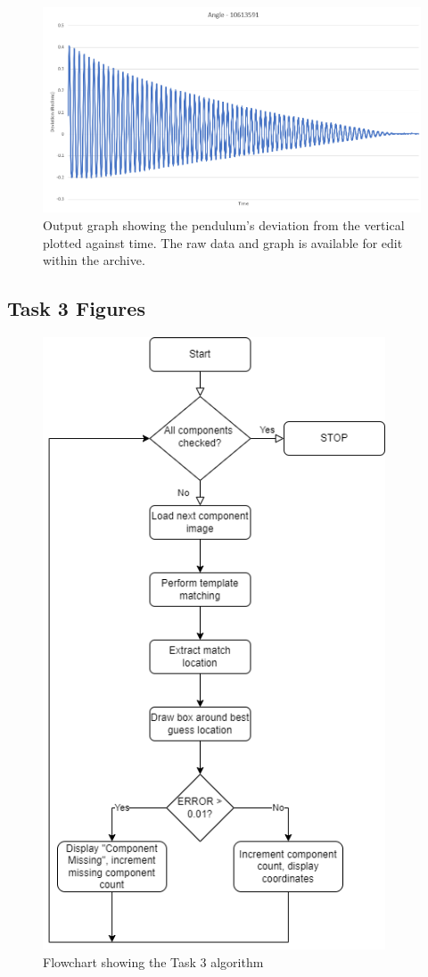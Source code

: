 \documentclass[conference]{IEEEtran}
\begin{document}
\begin{figure}[H]
\centering
\includegraphics[width=5in]{t2_graph}
\caption{Output graph showing the pendulum's deviation from the vertical plotted against time. The raw data and graph is available for edit within the archive.}
\label{fig_t2graph}
\end{figure}


\subsection{Task 3 Figures}\label{app:T3}
\begin{figure}[H]
\centering
\includegraphics[width=4in]{Task3_flowchart}
\caption{Flowchart showing the Task 3 algorithm}
\label{fig:task2_flowchart}
\end{figure}
\end{document}
